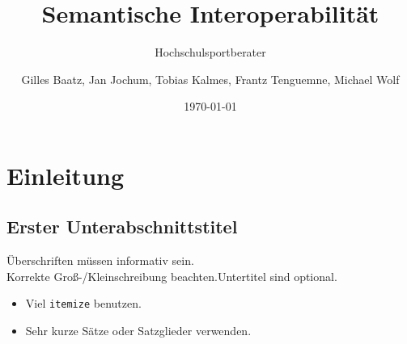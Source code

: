\documentclass{beamer}
\title[Hochschulsportberater] %
{Semantische Interoperabilität}
\subtitle
{Hochschulsportberater} %
\author{Gilles Baatz, Jan Jochum, Tobias Kalmes, Frantz Tenguemne, Michael Wolf}
\institute[htw saar] %
{
  HTW des Saarlandes
}
\date[Semantische Interoperabilität] %
{\today}
\begin{document}
\begin{frame}
  \titlepage
\end{frame}







\section{Einleitung}

\subsection[Kurzversion des ersten Unterabschnittstitels]
{Erster Unterabschnittstitel}

\begin{frame}{Überschriften müssen informativ sein.\\
    Korrekte Groß-/Kleinschreibung beachten.}{Untertitel sind optional.}

  \begin{itemize}
  \item
    Viel \texttt{itemize} benutzen.
  \item
    Sehr kurze Sätze oder Satzglieder verwenden.
  \end{itemize}
\end{frame}
\end{document}
